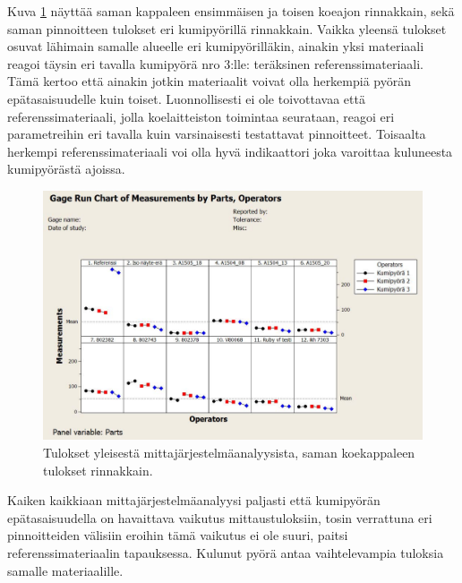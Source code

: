 \documentclass[12pt,a4paper,finnish]{tutthesis}
\begin{document}
Kuva \ref{fig:ygrr2} näyttää saman kappaleen ensimmäisen ja toisen koeajon rinnakkain, sekä saman pinnoitteen tulokset eri kumipyörillä rinnakkain.
Vaikka yleensä tulokset osuvat lähimain samalle alueelle eri kumipyörilläkin, ainakin yksi materiaali reagoi täysin eri tavalla kumipyörä nro 3:lle: teräksinen referenssimateriaali. Tämä kertoo että ainakin jotkin materiaalit voivat olla herkempiä pyörän epätasaisuudelle kuin toiset. Luonnollisesti ei ole toivottavaa että referenssimateriaali, jolla koelaitteiston toimintaa seurataan, reagoi eri parametreihin eri tavalla kuin varsinaisesti testattavat pinnoitteet. Toisaalta herkempi referenssimateriaali voi olla hyvä indikaattori joka varoittaa kuluneesta kumipyörästä ajoissa.

\begin{figure}
  \begin{center}
    \includegraphics[width=1.0\textwidth]{ygrr2}
  \end{center}
  \caption[Yleinen mittajärjestelmäanalyysi: Rinnakkaiset tulokset]{Tulokset yleisestä mittajärjestelmäanalyysista, saman koekappaleen tulokset rinnakkain.}
  \label{fig:ygrr2}
\end{figure}






Kaiken kaikkiaan mittajärjestelmäanalyysi paljasti että kumipyörän epätasaisuudella on havaittava vaikutus mittaustuloksiin, tosin verrattuna eri pinnoitteiden välisiin eroihin tämä vaikutus ei ole suuri, paitsi referenssimateriaalin tapauksessa. Kulunut pyörä antaa vaihtelevampia tuloksia samalle materiaalille.
\end{document}
